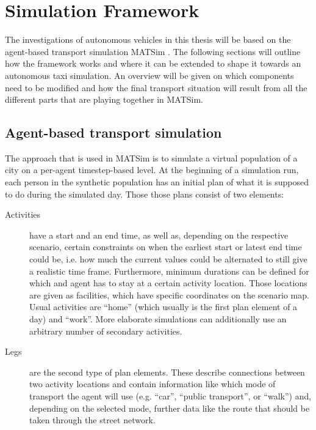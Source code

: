 \section{Simulation Framework}
\label{sec:matsim}

The investigations of autonomous vehicles in this thesis will be based on the
agent-based transport simulation MATSim \citep{Horni2015}. The following sections
will outline how the framework works and where it can be extended to shape it
towards an autonomous taxi simulation. An overview will be given on which components
need to be modified and how the final transport situation will result from all
the different parts that are playing together in MATSim.

\subsection{Agent-based transport simulation}

The approach that is used in MATSim is to simulate a virtual population of a city on a per-agent
timestep-based level. At the beginning of a simulation run, each person in the synthetic
population has an initial plan of what it is supposed to do during the simulated day. Those
those plans consist of two elements:

\begin{description}

\item[Activities] have a start and an end time, as well as, depending on the
respective scenario, certain constraints on when the earliest start or latest
end time could be, i.e. how much the current values could be alternated to still
give a realistic time frame. Furthermore, minimum durations can be defined for
which and agent has to stay at a certain activity location. Those locations are
given as facilities, which have specific coordinates on the scenario map.
Usual activities are
``home'' (which usually is the first plan element of a day) and ``work''. More
elaborate simulations can additionally use an arbitrary number of secondary
activities.

\item[Legs] are the second type of plan elements. These describe connections
between two activity locations and contain information like which mode of transport
the agent will use (e.g. ``car'', ``public transport'', or ``walk'') and, depending
on the selected mode, further data like the route that should be taken through
the street network.

\end{description}

